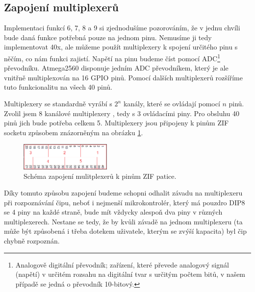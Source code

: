 \documentclass[11pt,a4paper,twoside,openright]{report}
\begin{document}
\subsection {Zapojení multiplexerů}

Implementaci funkcí 6, 7, 8 a 9 si zjednodušíme pozorováním, že v jednu chvíli bude daná funkce potřebná pouze na jednom pinu. Nemusíme ji tedy implementovat 40x, ale můžeme použít multiplexery k spojení určitého pinu s něčím, co nám funkci zajistí. Napětí na pinu budeme číst pomocí ADC\footnote{Analogově digitální převodník; zařízení, které převede analogový signál (napětí) v určitém rozsahu na digitální tvar s určitým počtem bitů, v našem případě se jedná o převodník 10-bitový.} převodníku. Atmega2560 disponuje jedním ADC převodníkem, který je ale vnitřně multiplexován na 16 GPIO pinů. Pomocí dalších multiplexerů rozšíříme tuto funkcionalitu na všech 40 pinů.


Multiplexery se standardně vyrábí s $2^n$ kanály, které se ovládají pomocí $n$ pinů. Zvolil jsem 8 kanálové multiplexery \cite{multiplexer}, tedy s 3 ovládacími piny. Pro obsluhu 40 pinů jich bude potřeba celkem 5. Multiplexery jsou připojeny k pinům ZIF socketu způsobem znázorněným na obrázku \ref{fig:mux_diagram}.

\begin{figure}[ht!]
  \includegraphics[width=0.4\textwidth]{img/mux_diagram.png}
  \centering
  \caption{Schéma zapojení mulitplexerů k pinům ZIF patice.}
  \label{fig:mux_diagram}
\end{figure}

Díky tomuto způsobu zapojení budeme schopni odhalit závadu na multiplexeru při rozpoznávání čipu, neboť i nejmenší mikrokontrolér, který má pouzdro DIP8 se 4 piny na každé straně, bude mít vždycky alespoň dva piny v různých multiplexerech. Nestane se tedy, že by kvůli závadě na jednom multiplexeru (ta může být způsobená i třeba dotekem uživatele, kterým se zvýší kapacita) byl čip chybně rozpoznán.
\end{document}
